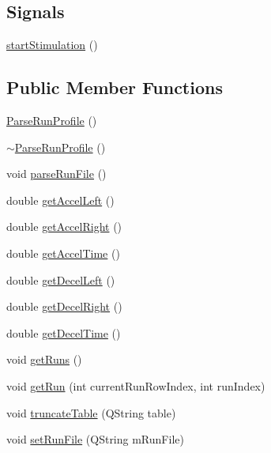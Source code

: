 \subsection*{Signals}
\begin{DoxyCompactItemize}
\item 
\hyperlink{class_parse_run_profile_a633c71cd3f2610c84745c0d70695f45b}{start\+Stimulation} ()
\end{DoxyCompactItemize}
\subsection*{Public Member Functions}
\begin{DoxyCompactItemize}
\item 
\hyperlink{class_parse_run_profile_aec4e56db3a472345a1460fc1e702cbec}{Parse\+Run\+Profile} ()
\item 
\hyperlink{class_parse_run_profile_abbd0d62620a0b7b1754843544e57b166}{$\sim$\+Parse\+Run\+Profile} ()
\item 
void \hyperlink{class_parse_run_profile_a4d7cec4c1bf3b5f2ca41edabb098ac45}{parse\+Run\+File} ()
\item 
double \hyperlink{class_parse_run_profile_a07cda302c0032d378d1b10d0045e25be}{get\+Accel\+Left} ()
\item 
double \hyperlink{class_parse_run_profile_af5cde00690cd8d72674d713890d2e5a1}{get\+Accel\+Right} ()
\item 
double \hyperlink{class_parse_run_profile_a9a53b91ed996a2730f84c93946576e6a}{get\+Accel\+Time} ()
\item 
double \hyperlink{class_parse_run_profile_a7ce3d630a0ea5925525ee902f25d44e1}{get\+Decel\+Left} ()
\item 
double \hyperlink{class_parse_run_profile_af21d7e6a341316569cf5905fe46a00b3}{get\+Decel\+Right} ()
\item 
double \hyperlink{class_parse_run_profile_a212d5f9f986c03745be41a5fe610ea8e}{get\+Decel\+Time} ()
\item 
void \hyperlink{class_parse_run_profile_a285a6e835fe873d2a88fa1415224c66a}{get\+Runs} ()
\item 
void \hyperlink{class_parse_run_profile_a1f064521af699320f5da111e9cb81625}{get\+Run} (int current\+Run\+Row\+Index, int run\+Index)
\item 
void \hyperlink{class_parse_run_profile_a4001ee3344847bda70e39cba1c14cd61}{truncate\+Table} (Q\+String table)
\item 
void \hyperlink{class_parse_run_profile_a7d1a1e31457aaac5f87067181588e8c7}{set\+Run\+File} (Q\+String m\+Run\+File)

\end{DoxyCompactItemize}
